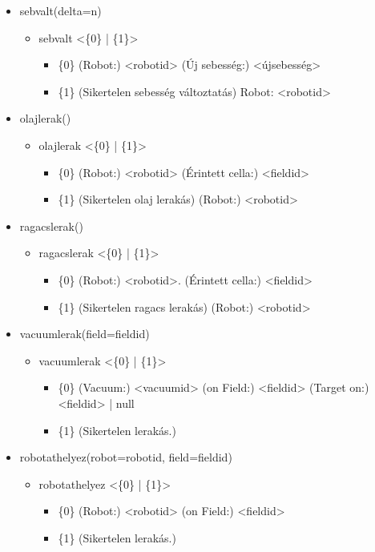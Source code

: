 \begin{itemize}
	\item sebvalt(delta=n)
	\begin{itemize}
		\item sebvalt  <\{0\} | \{1\}>
		\begin{itemize}
			\item \{0\} (Robot:) <robotid> (Új sebesség:) <újsebesség>
			\item \{1\} (Sikertelen sebesség változtatás) Robot: <robotid>
		\end{itemize}
	\end{itemize}
	

	
	\item olajlerak()
	\begin{itemize}
		\item olajlerak  <\{0\} | \{1\}>
		\begin{itemize}
			\item \{0\} (Robot:) <robotid>  (Érintett cella:) <fieldid>
			\item \{1\} (Sikertelen olaj lerakás) (Robot:) <robotid>
		\end{itemize}
	\end{itemize}
	
	\item ragacslerak()
	\begin{itemize}
		\item ragacslerak  <\{0\} | \{1\}>
		\begin{itemize}
			\item \{0\} (Robot:) <robotid>. (Érintett cella:) <fieldid>
			\item \{1\} (Sikertelen ragacs lerakás) (Robot:) <robotid>
		\end{itemize}
	\end{itemize}	
	
	\item vacuumlerak(field=fieldid)
	\begin{itemize}
		\item vacuumlerak  <\{0\} | \{1\}>
		\begin{itemize}
			\item \{0\} (Vacuum:) <vacuumid> (on Field:) <fieldid> (Target on:) {<fieldid> | null}
			\item \{1\} (Sikertelen lerakás.)
		\end{itemize}
	\end{itemize}	
	
	\item robotathelyez(robot=robotid, field=fieldid)
	\begin{itemize}
		\item robotathelyez  <\{0\} | \{1\}>
		\begin{itemize}
			\item \{0\} (Robot:) <robotid> (on Field:) <fieldid> 
			\item \{1\} (Sikertelen lerakás.)
		\end{itemize}
	\end{itemize}	
	

\end{itemize}

